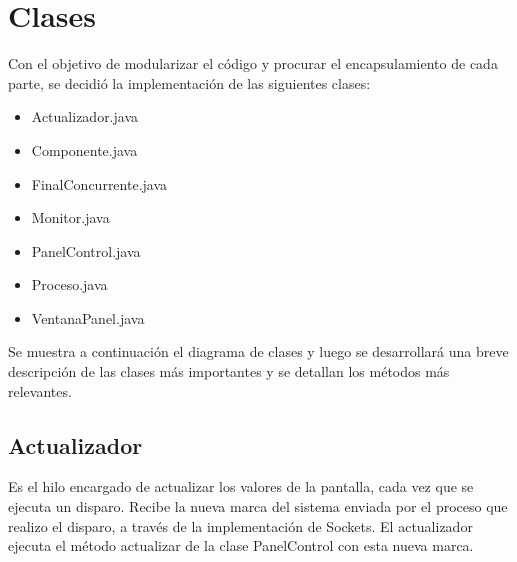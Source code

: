 \documentclass[12pt]{article} %
\begin{document}
\section{Clases}
Con el objetivo de modularizar el código y procurar el encapsulamiento de cada parte, se decidió la implementación de las siguientes clases:
\begin{itemize}
\item Actualizador.java
\item Componente.java
\item FinalConcurrente.java
\item Monitor.java
\item PanelControl.java
\item Proceso.java
\item VentanaPanel.java
\end{itemize}
Se muestra a continuación el diagrama de clases y luego se desarrollará una breve descripción de las clases más importantes y se detallan los métodos más relevantes.
\begin{figure}[H] %
\label{fig:DiagramaDeClases}
\end{figure}
\subsection{Actualizador}
Es el hilo encargado de actualizar los valores de la pantalla, cada vez que se ejecuta un disparo. Recibe la nueva marca del sistema enviada por el proceso que realizo el disparo, a través de la implementación de Sockets. El actualizador ejecuta el método actualizar de la clase PanelControl con  esta nueva marca.
\end{document}
